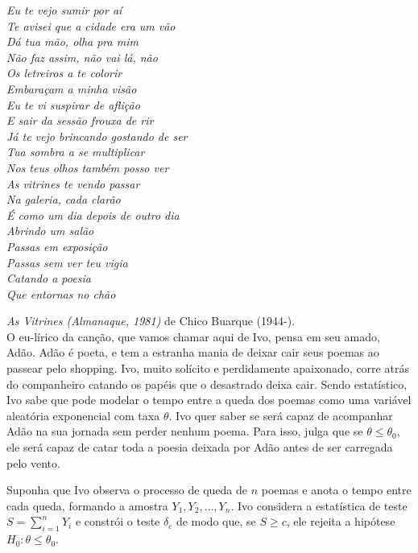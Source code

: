 \documentclass[a4paper,10pt, notitlepage]{report}
\begin{document}
        \begin{center}\textit{
        Eu te vejo sumir por aí\\
        Te avisei que a cidade era um vão\\
        Dá tua mão, olha pra mim\\
        Não faz assim, não vai lá, não\\
        Os letreiros a te colorir\\
        Embaraçam a minha visão\\
        Eu te vi suspirar de aflição\\
        E sair da sessão frouxa de rir\\
        Já te vejo brincando gostando de ser\\
        Tua sombra a se multiplicar\\
        Nos teus olhos também posso ver\\
        As vitrines te vendo passar\\
        Na galeria, cada clarão\\
        É como um dia depois de outro dia\\
        Abrindo um salão\\
        Passas em exposição\\
        Passas sem ver teu vigia\\
        Catando a poesia\\
        Que entornas no chão\\
        }
        \end{center}
        \textit{As Vitrines (Almanaque, 1981)} de Chico Buarque (1944-).\\            
        
O eu-lírico da canção, que vamos chamar aqui de Ivo, pensa em seu amado, Adão.
Adão é poeta, e tem a estranha mania de deixar cair seus poemas ao passear pelo shopping.
Ivo, muito solícito e perdidamente apaixonado, corre atrás do companheiro catando os papéis que
o desastrado deixa cair.
Sendo estatístico, Ivo sabe que pode modelar o tempo entre a queda dos poemas como uma variável aleatória exponencial com taxa $\theta$.
Ivo quer saber se será capaz de acompanhar Adão na sua jornada sem perder nenhum poema.
Para isso, julga que se $\theta \leq \theta_0$, ele será capaz de catar toda a poesia deixada por Adão antes de ser carregada pelo vento.

Suponha que Ivo observa o processo de queda de $n$ poemas e anota o tempo entre cada queda, formando a amostra $Y_1, Y_2, \ldots, Y_n$.
Ivo considera a estatística de teste $S = \sum_{i=1}^n Y_i$ e constrói o teste $\delta_c$ de modo que, se $S \geq c$, ele rejeita a hipótese $H_0: \theta \leq \theta_0$.
\end{document}
